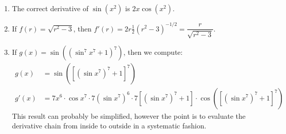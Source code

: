 \begin{exs}\leavevmode
  \begin{enumerate}
    \item The correct derivative of $ \sin(x^2) $ is $ 2x \cos(x^2) $.
    \item If $ f(r) = \sqrt{r^2 - 3} $, then $ f'(r) = 2r \frac{1}{2} \left(r^2 - 3\right)^{-1/2} = \dfrac{r}{\sqrt{r^2 - 3}} $.
    \item If $ g(x) = \sin((\sin^7 x^7 + 1)^7) $, then we compute:
          \begin{align*}
            g(x)  &= \sin \left( \left[ \left( \sin x^7 \right)^7 + 1 \right]^7 \right)\\
            g'(x) &= 7x^6 \cdot \cos x^7 \cdot 7\left(\sin x^7\right)^6 \cdot 7\left[\left(\sin x^7\right)^7 + 1\right]
                          \cdot \cos \left( \left[ \left( \sin x^7 \right)^7 + 1 \right]^7 \right)
          \end{align*}
          This result can probably be simplified, however the point is to evaluate the derivative chain from inside to outside in a systematic fashion.
  \end{enumerate}
\end{exs}

